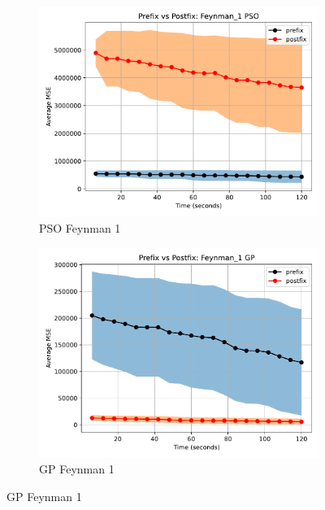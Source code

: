 \documentclass[12pt]{iopart}
\begin{document}
\begin{figure}
    \vspace{0.5cm}
    
    \begin{subfigure}[b]{0.4\textwidth}
        \includegraphics[width=\linewidth, keepaspectratio]{AIFeynman_Benchmarks/PrePostFeynman_1PSO.pdf}
        \caption{PSO Feynman 1}
        \label{subfig:feynman_1_PSO}
    \end{subfigure}
    \begin{subfigure}[b]{0.4\textwidth}
        \includegraphics[width=\linewidth, keepaspectratio]{AIFeynman_Benchmarks/PrePostFeynman_1GP.pdf}
        \caption{GP Feynman 1}
        \label{subfig:feynman_1_GP}
    \end{subfigure}
    

\end{figure}
\end{document}
